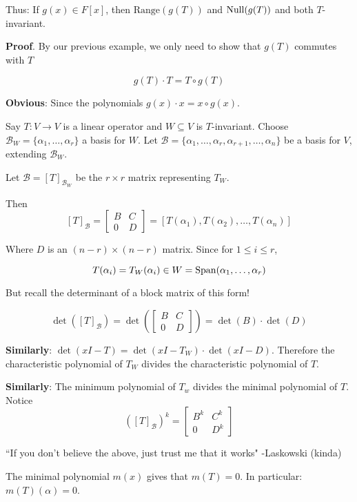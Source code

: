 \documentclass[12pt]{article}
\def\range{\text{Range}}
\def\B{\mathcal B}
\def\Tinv{$T$-invariant}
\begin{document}
  Thus: If $g(x) \in F[x]$, then $\range(g(T))$ and $\mathrm{Null}(g(T))$ and both
  \Tinv.
  
  {\bf Proof}. By our previous example, we only need to show that $g(T)$
  commutes with $T$

  \[
    g(T) \cdot T = T \circ g(T)
  \]

  {\bf Obvious}: Since the polynomials $g(x) \cdot x = x \circ g(x)$.

  Say $T: V \to V$ is a linear operator and $W \subseteq V$ is \Tinv. Choose
  $\B_W = \{\alpha_1, \dots, \alpha_r\}$ a basis for $W$. Let $\B = \{\alpha_1,
  \dots, \alpha_r, \alpha_{r + 1}, \dots, \alpha_n\}$ be a basis for $V$,
  extending $\B_W$.

  Let $\B = [T]_{\B_W}$ be the $r \times r$ matrix representing $T_W$.

  Then
  \[
    [T]_\B = \begin{bmatrix}
      B & C \\
      0 & D
    \end{bmatrix}
    = [T(\alpha_1), T(\alpha_2), \dots, T(\alpha_n)]
  \]

  Where $D$ is an $(n - r) \times (n - r)$ matrix. Since for $1 \le i \le r$,

  \[
    T(\alpha_i) = T_W(\alpha_i) \in W = \mathrm{Span}(\alpha_1, \dots, \alpha_r)
  \]

  But recall the determinant of a block matrix of this form!

  \[
    \det\left([T]_\B\right) = \det\left(\begin{bmatrix}
      B & C \\
      0 & D
    \end{bmatrix}\right) =\det(B) \cdot \det(D)
  \]

  {\bf Similarly}: $\det(xI - T) = \det(xI - T_W) \cdot \det(xI - D)$. Therefore
  the characteristic polynomial of $T_W$ divides the characteristic polynomial
  of $T$.

  {\bf Similarly}: The minimum polynomial of $T_w$ divides the minimal
  polynomial of $T$. Notice  \[
    \left([T]_\B\right)^k = \begin{bmatrix}
      B^k & C^k \\
      0 & D^k
    \end{bmatrix}
  \]

  ``If you don't believe the above, just trust me that it works" -Laskowski
  (kinda)

  The minimal polynomial $m(x)$ gives that $m(T) = 0$. In particular:
  $m(T)(\alpha) = 0$.
\end{document}

